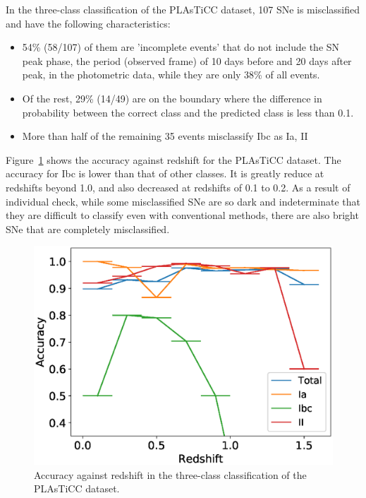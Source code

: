 \documentclass[useamsfonts]{pasj01}
\begin{document}
In the three-class classification of the PLAsTiCC dataset,
107 SNe is misclassified and have the following characteristics:
\begin{itemize}
\item 54\% (58/107) of them are 'incomplete events' that do not include the SN peak phase, the period (observed frame) of 10 days before and 20 days after peak, in the photometric data, while they are only 38\% of all events.
\item Of the rest, 29\% (14/49) are on the boundary where the difference in probability between the correct class and the predicted class is less than 0.1.
\item More than half of the remaining 35 events misclassify Ibc as Ia, II
\end{itemize}
Figure\ \ref{fig:misclass_rate_3class} shows the accuracy against redshift for the PLAsTiCC dataset.
The accuracy for Ibc is lower than that of other classes.
It is greatly reduce at redshifts beyond 1.0, and also decreased at redshifts of 0.1 to 0.2.
As a result of individual check, while some misclassified SNe are so dark and indeterminate that they are difficult to classify even with conventional methods, there are also bright SNe that are completely misclassified.
%
\begin{figure}[htbp]
  \begin{center}
     \includegraphics[width=\columnwidth]{figures/misclass_rate_plastic_3class.eps}
  \end{center}
  \caption{%
  Accuracy against redshift in the three-class classification of the PLAsTiCC dataset.
  }%
  \label{fig:misclass_rate_3class}
\end{figure}
%
%
\end{document}
